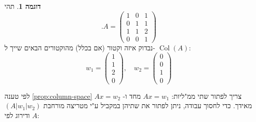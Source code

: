 \documentclass[12pt]{report}
\theoremstyle{plain}
\theoremstyle{definition}
\newtheorem{example}{דוגמה}[chapter]
\newcommand{\0}{\mathbf{0}}
\DeclareMathOperator{\Col}{Col}
\begin{document}
\begin{example}
תהי
$$
.A=
\begin{pmatrix}
1 & 0 & 1\\
0 & 1 & 1\\
1 & 1 & 2\\
0 & 0 & 1
\end{pmatrix}
$$
נבדוק איזה וקטור (אם בכלל) מהוקטורים הבאים שייך ל-
$\Col(A)$:
$$
w_1=
\begin{pmatrix}
1\\
1\\
2\\
0
\end{pmatrix},
\quad
w_2=
\begin{pmatrix}
0\\
0\\
1\\
0
\end{pmatrix}
$$

לפי טענה
\ref{prop:column-space}
צריך לפתור שתי ממ"ליות:
$Ax=w_1$
מחד ו-
$Ax=w_2$
מאידך. כדי לחסוך עבודה, ניתן לפתור את שתיהן במקביל ע"י מטריצה מורחבת 
$(A|w_1|w_2)$
ודירוג לפי
$A$:


\end{example}
\end{document}

